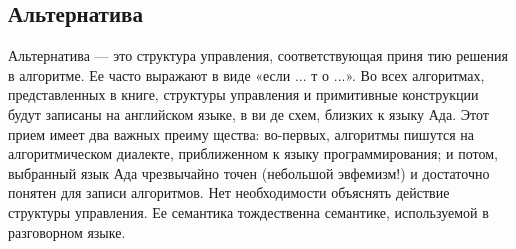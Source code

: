 \documentclass{mai_book}
\begin{document}
\subsection{Альтернатива}
Альтернатива — это структура управления,  соответствующая  приня­
тию решения в алгоритме. Ее часто выражают в виде «если ...  т о  ...». 
Во всех алгоритмах, представленных в книге, структуры управления и 
примитивные конструкции будут записаны на английском языке, в ви­
де схем, близких к языку Ада.  Этот прием имеет два важных преиму­
щества: во-первых, алгоритмы пишутся на алгоритмическом диалекте, 
приближенном к языку  программирования; и потом,  выбранный язык 
Ада чрезвычайно точен  (небольшой эвфемизм!)  и достаточно понятен 
для записи алгоритмов.
\parindent=1cm Нет необходимости объяснять действие структуры  управления.  Ее 
семантика тождественна семантике, используемой в разговорном языке.
\newline
\end{document}
